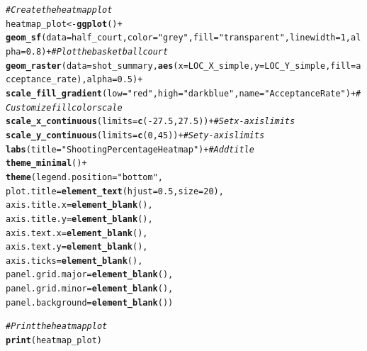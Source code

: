 \documentclass{article}\usepackage[]{graphicx}\usepackage[]{xcolor}
\makeatletter
\newcommand{\hlnum}[1]{\textcolor[rgb]{0.686,0.059,0.569}{#1}}%
\newcommand{\hlstr}[1]{\textcolor[rgb]{0.192,0.494,0.8}{#1}}%
\newcommand{\hlcom}[1]{\textcolor[rgb]{0.678,0.584,0.686}{\textit{#1}}}%
\newcommand{\hlopt}[1]{\textcolor[rgb]{0,0,0}{#1}}%
\newcommand{\hlstd}[1]{\textcolor[rgb]{0.345,0.345,0.345}{#1}}%
\newcommand{\hlkwb}[1]{\textcolor[rgb]{0.69,0.353,0.396}{#1}}%
\newcommand{\hlkwc}[1]{\textcolor[rgb]{0.333,0.667,0.333}{#1}}%
\newcommand{\hlkwd}[1]{\textcolor[rgb]{0.737,0.353,0.396}{\textbf{#1}}}%
\newenvironment{kframe}{%
 \def\at@end@of@kframe{}%
 \ifinner\ifhmode%
  \def\at@end@of@kframe{\end{minipage}}%
  \begin{minipage}{\columnwidth}%
 \fi\fi%
 \def\FrameCommand##1{\hskip\@totalleftmargin \hskip-\fboxsep
 \colorbox{shadecolor}{##1}\hskip-\fboxsep
     \hskip-\linewidth \hskip-\@totalleftmargin \hskip\columnwidth}%
 \MakeFramed {\advance\hsize-\width
   \@totalleftmargin\z@ \linewidth\hsize
   \@setminipage}}%
 {\par\unskip\endMakeFramed%
 \at@end@of@kframe}
\newenvironment{knitrout}{}{} %
\makeatother
\begin{document}
\begin{knitrout}
\begin{kframe}
\begin{alltt}
\hlcom{# Create the heatmap plot}
\hlstd{heatmap_plot} \hlkwb{<-} \hlkwd{ggplot}\hlstd{()} \hlopt{+}
  \hlkwd{geom_sf}\hlstd{(}\hlkwc{data} \hlstd{= half_court,} \hlkwc{color} \hlstd{=} \hlstr{"grey"}\hlstd{,} \hlkwc{fill} \hlstd{=} \hlstr{"transparent"}\hlstd{,} \hlkwc{linewidth} \hlstd{=} \hlnum{1}\hlstd{,} \hlkwc{alpha}\hlstd{=}\hlnum{0.8}\hlstd{)} \hlopt{+}  \hlcom{# Plot the basketball court}
  \hlkwd{geom_raster}\hlstd{(}\hlkwc{data} \hlstd{= shot_summary,} \hlkwd{aes}\hlstd{(}\hlkwc{x} \hlstd{= LOC_X_simple,} \hlkwc{y} \hlstd{= LOC_Y_simple,} \hlkwc{fill} \hlstd{= acceptance_rate),} \hlkwc{alpha}\hlstd{=}\hlnum{0.5}\hlstd{)} \hlopt{+}
  \hlkwd{scale_fill_gradient}\hlstd{(}\hlkwc{low} \hlstd{=} \hlstr{"red"}\hlstd{,} \hlkwc{high} \hlstd{=} \hlstr{"darkblue"}\hlstd{,} \hlkwc{name} \hlstd{=} \hlstr{"Acceptance Rate"}\hlstd{)} \hlopt{+}  \hlcom{# Customize fill color scale}
  \hlkwd{scale_x_continuous}\hlstd{(}\hlkwc{limits} \hlstd{=} \hlkwd{c}\hlstd{(}\hlopt{-}\hlnum{27.5}\hlstd{,} \hlnum{27.5}\hlstd{))} \hlopt{+}  \hlcom{# Set x-axis limits}
  \hlkwd{scale_y_continuous}\hlstd{(}\hlkwc{limits} \hlstd{=} \hlkwd{c}\hlstd{(}\hlnum{0}\hlstd{,} \hlnum{45}\hlstd{))} \hlopt{+}  \hlcom{# Set y-axis limits}
  \hlkwd{labs}\hlstd{(}\hlkwc{title} \hlstd{=} \hlstr{"Shooting Percentage Heatmap"}\hlstd{)} \hlopt{+}  \hlcom{# Add title}
  \hlkwd{theme_minimal}\hlstd{()} \hlopt{+}
  \hlkwd{theme}\hlstd{(}\hlkwc{legend.position} \hlstd{=} \hlstr{"bottom"}\hlstd{,}
        \hlkwc{plot.title} \hlstd{=} \hlkwd{element_text}\hlstd{(}\hlkwc{hjust} \hlstd{=} \hlnum{0.5}\hlstd{,} \hlkwc{size} \hlstd{=} \hlnum{20}\hlstd{),}
        \hlkwc{axis.title.x} \hlstd{=} \hlkwd{element_blank}\hlstd{(),}
        \hlkwc{axis.title.y} \hlstd{=} \hlkwd{element_blank}\hlstd{(),}
        \hlkwc{axis.text.x} \hlstd{=} \hlkwd{element_blank}\hlstd{(),}
        \hlkwc{axis.text.y} \hlstd{=} \hlkwd{element_blank}\hlstd{(),}
        \hlkwc{axis.ticks} \hlstd{=} \hlkwd{element_blank}\hlstd{(),}
        \hlkwc{panel.grid.major} \hlstd{=} \hlkwd{element_blank}\hlstd{(),}
        \hlkwc{panel.grid.minor} \hlstd{=} \hlkwd{element_blank}\hlstd{(),}
        \hlkwc{panel.background} \hlstd{=} \hlkwd{element_blank}\hlstd{())}

\hlcom{# Print the heatmap plot}
\hlkwd{print}\hlstd{(heatmap_plot)}
\end{alltt}


{\ttfamily\noindent\color{warningcolor}{\#\# Warning: Removed 132 rows containing missing values or values outside the scale range\\\#\# (`geom\_raster()`).}}\end{kframe}


\end{knitrout}
\end{document}
